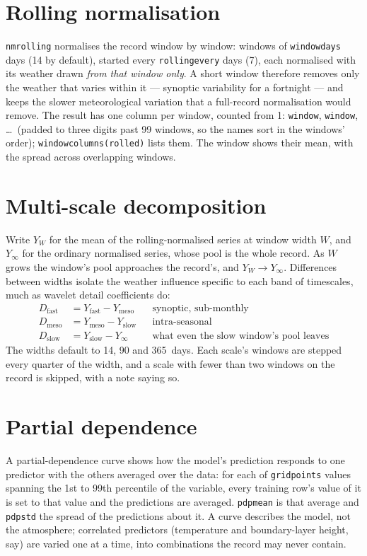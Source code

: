 \documentclass[11pt]{report}
\newcommand{\codeunderscore}{\textunderscore\allowbreak}
\newcommand{\code}[1]{\texttt{\let\_\codeunderscore #1}}
\begin{document}
\section{Rolling normalisation}\label{sec:rolling}
\code{nm\_rolling} normalises the record window by window: windows of \code{window\_days}
days (14 by default), started every \code{rolling\_every} days (7), each normalised with
its weather drawn \emph{from that window only}. A short window therefore removes only the
weather that varies within it --- synoptic variability for a fortnight --- and keeps the
slower meteorological variation that a full-record normalisation would remove. The result
has one column per window, counted from 1: \code{window\_01}, \code{window\_02}, \dots\
(padded to three digits past 99 windows, so the names sort in the windows' order);
\code{window\_columns(rolled)} lists them. The window shows their mean, with the spread
across overlapping windows.

\section{Multi-scale decomposition}\label{sec:multiscale}
Write $Y_W$ for the mean of the rolling-normalised series at window width $W$, and
$Y_\infty$ for the ordinary normalised series, whose pool is the whole record. As $W$
grows the window's pool approaches the record's, and $Y_W \to Y_\infty$. Differences
between widths isolate the weather influence specific to each band of timescales,
much as wavelet detail coefficients do:
\begin{align}
  D_\text{fast} &= Y_\text{fast} - Y_\text{meso} && \text{synoptic, sub-monthly} \\
  D_\text{meso} &= Y_\text{meso} - Y_\text{slow} && \text{intra-seasonal} \\
  D_\text{slow} &= Y_\text{slow} - Y_\infty      && \text{what even the slow window's pool leaves}
\end{align}
The widths default to 14, 90 and 365~days. Each scale's windows are stepped every quarter
of the width, and a scale with fewer than two windows on the record is skipped, with a
note saying so.

\section{Partial dependence}\label{sec:pdptheory}
A partial-dependence curve shows how the model's prediction responds to one predictor
with the others averaged over the data: for each of \code{grid\_points} values spanning
the 1st to 99th percentile of the variable, every training row's value of it is set to
that value and the predictions are averaged. \code{pdp\_mean} is that average and
\code{pdp\_std} the spread of the predictions about it. A curve describes the model, not
the atmosphere; correlated predictors (temperature and boundary-layer height, say) are
varied one at a time, into combinations the record may never contain.
\end{document}
